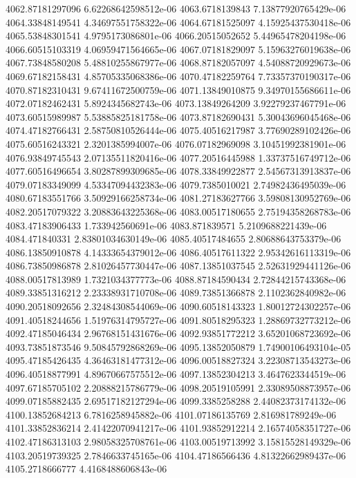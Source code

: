 {4062.87181297096 6.62268642598512e-06
4063.6718139843 7.13877920765429e-06
4064.33848149541 4.34697551758322e-06
4064.67181525097 4.15925437530418e-06
4065.53848301541 4.9795173086801e-06
4066.20515052652 5.44965478204198e-06
4066.60515103319 4.06959471564665e-06
4067.07181829097 5.15963276019638e-06
4067.73848580208 5.48810255867977e-06
4068.87182057097 4.54088720929673e-06
4069.67182158431 4.85705335068386e-06
4070.47182259764 7.73357370190317e-06
4070.87182310431 9.67411672500759e-06
4071.13849010875 9.34970155686611e-06
4072.07182462431 5.8924345682743e-06
4073.13849264209 3.92279237467791e-06
4073.60515989987 5.53885825181758e-06
4073.87182690431 5.30043696045468e-06
4074.47182766431 2.58750810526444e-06
4075.40516217987 3.77690289102426e-06
4075.60516243321 2.3201385994007e-06
4076.07182969098 3.10451992381901e-06
4076.93849745543 2.07135511820416e-06
4077.20516445988 1.33737516749712e-06
4077.60516496654 3.80287899309685e-06
4078.33849922877 2.54567313913837e-06
4079.07183349099 4.53347094432383e-06
4079.7385010021 2.74982436495039e-06
4080.67183551766 3.50929166258734e-06
4081.27183627766 3.59808130952769e-06
4082.20517079322 3.20883643225368e-06
4083.00517180655 2.75194358268783e-06
4083.47183906433 1.733942560691e-06
4083.871839571 5.2109688221439e-06
4084.471840331 2.83801034630149e-06
4085.40517484655 2.80688643753379e-06
4086.13850910878 4.14333654379012e-06
4086.40517611322 2.95342616113319e-06
4086.73850986878 2.81026457730447e-06
4087.13851037545 2.52631929441126e-06
4088.00517813989 1.7321034377773e-06
4088.87184590434 2.72844215743368e-06
4089.33851316212 2.23338931710708e-06
4089.73851366878 2.1102362840982e-06
4090.20518092656 2.32484308544069e-06
4090.60518143323 1.80012724302257e-06
4091.40518244656 1.51976314795727e-06
4091.80518295323 1.28869732773212e-06
4092.47185046434 2.96768151431676e-06
4092.93851772212 3.65201068723692e-06
4093.73851873546 9.50845792868269e-06
4095.13852050879 1.74900106493104e-05
4095.47185426435 4.36463181477312e-06
4096.00518827324 3.22308713543273e-06
4096.40518877991 4.89670667575512e-06
4097.13852304213 3.4647623344519e-06
4097.67185705102 2.20888215786779e-06
4098.20519105991 2.33089508873957e-06
4099.07185882435 2.69517182127294e-06
4099.3385258288 2.44082373174132e-06
4100.13852684213 6.7816258945882e-06
4101.07186135769 2.816981789249e-06
4101.33852836214 2.41422070941217e-06
4101.93852912214 2.16574058351727e-06
4102.47186313103 2.98058325708761e-06
4103.00519713992 3.15815528149329e-06
4103.20519739325 2.7846633745165e-06
4104.47186566436 4.81322662989437e-06
4105.2718666777 4.4168488606843e-06
}
